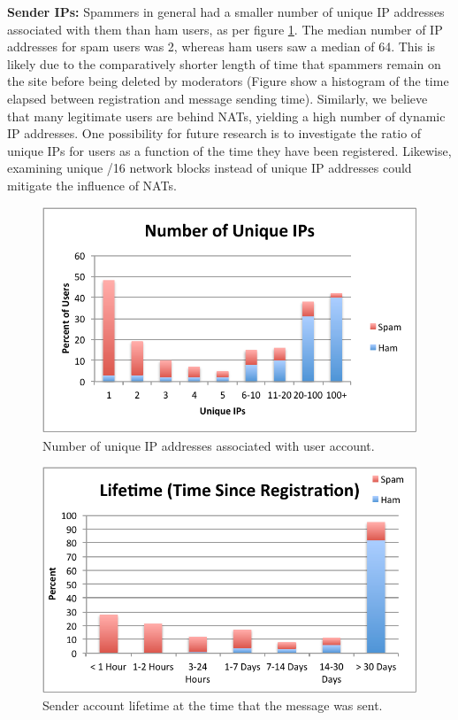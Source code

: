 \documentclass[preprint]{acm_proc_article-sp}
\begin{document}
\textbf{Sender IPs:} Spammers in general had a smaller number of unique IP addresses associated 
with them than ham users, as per figure \ref{fig:uniqip}. The median number of IP addresses for 
spam users was 2, whereas ham users saw a median of 64. This is likely due to the comparatively 
shorter length of time that spammers remain on the site before being deleted by moderators (Figure 
\label{fig:lifetime} show a histogram of the time elapsed between registration and message sending 
time).  Similarly, we believe that many legitimate users are behind NATs, yielding a high number 
of dynamic IP addresses. One possibility for future research is to investigate the ratio of 
unique IPs for users as a function of the time they have been registered. Likewise, examining 
unique /16 network blocks instead of unique IP addresses could mitigate the influence of NATs.

\begin{figure}[h]
    \centering
    \includegraphics[width=\linewidth]{figures/unique-ips.pdf}
    \caption{Number of unique IP addresses associated with user account.}
    \label{fig:uniqip}
\end{figure}

\begin{figure}[h]
    \centering
    \includegraphics[width=\linewidth]{figures/lifetime.pdf}
    \caption{Sender account lifetime at the time that the message was sent.}
    \label{fig:lifetime}
\end{figure}
\end{document}
